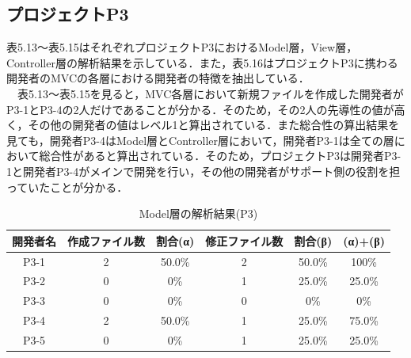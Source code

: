 \documentclass{funthesis}
\begin{document}
\subsection{プロジェクトP3}
表5.13〜表5.15はそれぞれプロジェクトP3におけるModel層，View層，Controller層の解析結果を示している．また，表5.16はプロジェクトP3に携わる開発者のMVCの各層における開発者の特徴を抽出している．
\\　表5.13〜表5.15を見ると，MVC各層において新規ファイルを作成した開発者がP3-1とP3-4の2人だけであることが分かる．そのため，その2人の先導性の値が高く，その他の開発者の値はレベル1と算出されている．また総合性の算出結果を見ても，開発者P3-4はModel層とController層において，開発者P3-1は全ての層において総合性があると算出されている．そのため，プロジェクトP3は開発者P3-1と開発者P3-4がメインで開発を行い，その他の開発者がサポート側の役割を担っていたことが分かる．
\begin{table}[H]
  \begin{center}
\begin{tabular}{|c|c|c|c|c||c|}\hline
開発者名&作成ファイル数&割合(α)&修正ファイル数&割合(β)&(α)+(β)\\ \hline
P3-1 & 2 & 50.0\% & 2 & 50.0\% & 100\%\\ \hline \hline
P3-2 & 0 & 0\% & 1 & 25.0\% & 25.0\%\\ \hline \hline
P3-3 & 0 & 0\% & 0 & 0\% & 0\%\\ \hline \hline
P3-4 & 2 & 50.0\% & 1 & 25.0\% & 75.0\%\\ \hline \hline
P3-5 & 0 & 0\% & 1 & 25.0\% & 25.0\%\\ \hline 
\end{tabular}    
\caption{Model層の解析結果(P3)}    \label{sample}
  \end{center}
\end{table}
\end{document}
